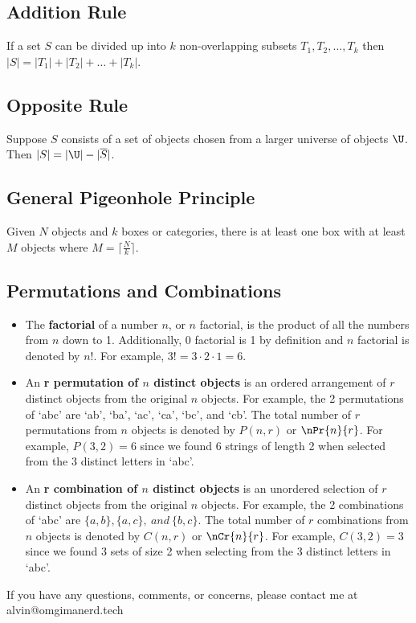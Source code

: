 \documentclass[letterpaper, 12pt]{math}
\begin{document}
\subsection*{Addition Rule}
If a set \( S \) can be divided up into \( k \) non-overlapping subsets
\( T_{1},T_{2},\dots,T_{k} \) then \( |S| = |T_{1}|+|T_{2}|+\dots+|T_{k}| \).

\subsection*{Opposite Rule}
Suppose \( S \) consists of a set of objects chosen from a larger universe of
objects \( \U \). Then \( |S| = |\U|-|\overline{S}| \).

\subsection*{General Pigeonhole Principle}
Given \( N \) objects and \( k \) boxes or categories, there is at least one box
with at least \( M \) objects where \( M = \lceil\frac{N}{k}\rceil \).

\subsection*{Permutations and Combinations}
\begin{itemize}
  \item The \textbf{factorial} of a number \( n \), or \( n \) factorial, is
    the product of all the numbers from \( n \) down to 1. Additionally, 0
    factorial is 1 by definition and \( n \) factorial is denoted by \( n! \).
    For example, \( 3! = 3\cdot2\cdot1 = 6 \).
  \item An \textbf{r permutation of \( n \) distinct objects} is an ordered
    arrangement of \( r \) distinct objects from the original \( n \) objects.
    For example, the 2 permutations of `abc' are `ab', `ba', `ac', `ca', `bc',
    and `cb'. The total number of \( r \) permutations from \( n \) objects
    is denoted by \( P(n,r) \) or \( \nPr{n}{r} \). For example, \( P(3,2) = 6
    \) since we found 6 strings of length 2 when selected from the 3 distinct
    letters in `abc'.
  \item An \textbf{r combination of \( n \) distinct objects} is an unordered
    selection of \( r \) distinct objects from the original \( n \) objects.
    For example, the 2 combinations of `abc' are \( \{a,b\},\{a,c\},\ and\
    \{b,c\} \). The total number of \( r \) combinations from \( n \) objects
    is denoted by \( C(n,r) \) or \( \nCr{n}{r} \). For example, \( C(3,2) = 3
    \) since we found 3 sets of size 2 when selecting from the 3 distinct
    letters in `abc'.
\end{itemize}

\begin{center}
  If you have any questions, comments, or concerns, please contact me at
  alvin@omgimanerd.tech
\end{center}
\end{document}
